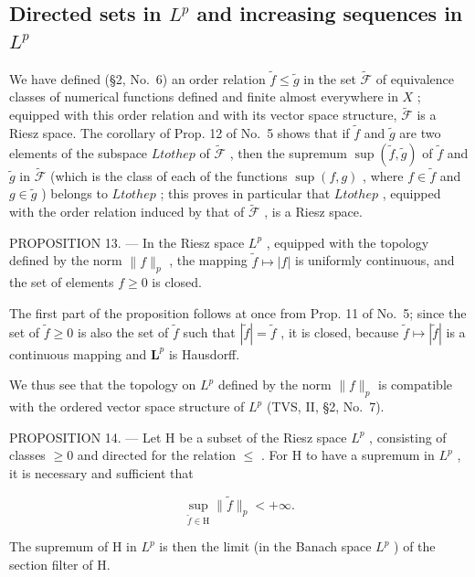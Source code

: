 \subsection{\texorpdfstring{Directed sets in \(L^{p}\) and increasing sequences in \(L^{p}\)}{Directed sets in L to the p and increasing sequences in L to the p}}

We have defined (§2, No.~6) an order relation \(\widetilde{f} \leqslant \widetilde{g}\) in the set \(\widetilde{\mathcal{F}}\) of equivalence classes of numerical functions defined and finite almost everywhere in \(X\) ; equipped with this order relation and with its vector space structure, \(\widetilde{\mathcal{F}}\) is a Riesz space. The corollary of Prop. 12 of No.~5 shows that if \(\widetilde{f}\) and \(\widetilde{g}\) are two elements of the subspace \(L to the p\) of \(\widetilde{\mathcal{F}}\) , then the supremum \(\sup (\widetilde{f}, \widetilde{g})\) of \(\widetilde{f}\) and \(\widetilde{g}\) in \(\widetilde{\mathcal{F}}\) (which is the class of each of the functions \(\sup (f, g)\) , where \(f \in \widetilde{f}\) and \(g \in \widetilde{g}\) ) belongs to \(L to the p\) ; this proves in particular that \(L to the p\) , equipped with the order relation induced by that of \(\widetilde{\mathcal{F}}\) , is a Riesz space.

PROPOSITION 13. --- In the Riesz space \(L^{p}\) , equipped with the topology defined by the norm \(\|f\|_{p}\) , the mapping \(\widetilde{f} \mapsto |f|\) is uniformly continuous, and the set of elements \(f \geqslant 0\) is closed.

The first part of the proposition follows at once from Prop. 11 of No.~5; since the set of \(\widetilde{f} \geqslant 0\) is also the set of \(\widetilde{f}\) such that \(|\widetilde{f}| = \widetilde{f}\) , it is closed, because \(\widetilde{f} \mapsto |\widetilde{f}|\) is a continuous mapping and \(\mathbf{L}^p\) is Hausdorff.

We thus see that the topology on \(L^{p}\) defined by the norm \(\|f\|_{p}\) is compatible with the ordered vector space structure of \(L^{p}\) (TVS, II, §2, No.~7).

PROPOSITION 14. --- Let H be a subset of the Riesz space \(L^{p}\) , consisting of classes \(\geqslant 0\) and directed for the relation \(\leqslant\) . For H to have a supremum in \(L^{p}\) , it is necessary and sufficient that

\[
\sup _ {\widetilde {f} \in \mathrm{H}} \| \widetilde {f} \| _ {p} <   + \infty .
\]

The supremum of H in \(L^{p}\) is then the limit (in the Banach space \(L^{p}\) ) of the section filter of H.

